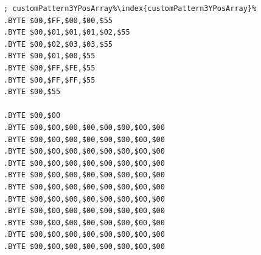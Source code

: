 \begin{minipage}[b]{0.33\linewidth}
\begin{lrbox}{\mybox}
\begin{lstlisting}[basicstyle=\ttfamily\tiny,escapechar=\%]
; customPattern3YPosArray%\index{customPattern3YPosArray}%
.BYTE $00,$FF,$00,$00,$55
.BYTE $00,$01,$01,$01,$02,$55
.BYTE $00,$02,$03,$03,$55
.BYTE $00,$01,$00,$55
.BYTE $00,$FF,$FE,$55
.BYTE $00,$FF,$FF,$55
.BYTE $00,$55

.BYTE $00,$00
.BYTE $00,$00,$00,$00,$00,$00,$00,$00
.BYTE $00,$00,$00,$00,$00,$00,$00,$00
.BYTE $00,$00,$00,$00,$00,$00,$00,$00
.BYTE $00,$00,$00,$00,$00,$00,$00,$00
.BYTE $00,$00,$00,$00,$00,$00,$00,$00
.BYTE $00,$00,$00,$00,$00,$00,$00,$00
.BYTE $00,$00,$00,$00,$00,$00,$00,$00
.BYTE $00,$00,$00,$00,$00,$00,$00,$00
.BYTE $00,$00,$00,$00,$00,$00,$00,$00
.BYTE $00,$00,$00,$00,$00,$00,$00,$00
.BYTE $00,$00,$00,$00,$00,$00,$00,$00
\end{lstlisting}
\end{lrbox}%
\scalebox{0.8}{\usebox{\mybox}}
\end{minipage}

